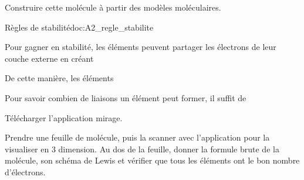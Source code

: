 \mesure
Construire cette molécule à partir des modèles moléculaires.

\begin{doc}{Règles de stabilité}{doc:A2_regle_stabilite}
  \begin{importants}
    Pour gagner en stabilité, les éléments peuvent partager les électrons de leur couche externe en créant 
    
    De cette manière, les éléments 
    
    Pour savoir combien de liaisons un élément peut former, il suffit de
  \end{importants}
\end{doc}


\telechargement Télécharger l'application mirage.

\mesure Prendre une feuille de molécule, puis la scanner avec l'application pour la visualiser en 3 dimension.
Au dos de la feuille, donner la formule brute de la molécule, son schéma de Lewis et vérifier que tous les éléments ont le bon nombre d'électrons.
